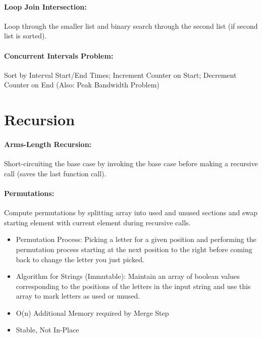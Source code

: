 \documentclass[12pt]{article}
\begin{document}
\paragraph{Loop Join Intersection:} Loop through the smaller list and binary search through the second list (if second list is sorted).

\paragraph{Concurrent Intervals Problem:} Sort by Interval Start/End Times; Increment Counter on Start; Decrement Counter on End (Also: Peak Bandwidth Problem)

\section{Recursion}

\paragraph{Arms-Length Recursion:} Short-circuiting the base case by invoking the base case before making a recursive call (saves the last function call).

\paragraph{Permutations:}Compute permutations by splitting array into used and unused sections and swap starting element with current element during recursive calls.
\begin{itemize}
	\item Permutation Process: Picking a letter for a given position and performing the permutation process starting at the next position to the right before coming back to change the letter you just picked.
	\item Algorithm for Strings (Immutable): Maintain an array of boolean values corresponding to the positions of the letters in the input string and use this array to mark letters as used or unused.
	\item O(n) Additional Memory required by Merge Step
	\item Stable, Not In-Place
\end{itemize}



\end{document}
